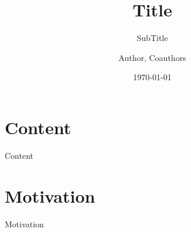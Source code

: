 \documentclass[9pt,pdftex]{beamer}
\title{Title}
\subtitle{SubTitle}
\author[FooterAuthor]{Author, Coauthors} %
\date{\today}
\institute{Technische Universität München}
\begin{document}
	\frame{\titlepage}

\section{Content}
\begin{frame}{Content}
\tableofcontents
\end{frame}
	

\section{Motivation}

\begin{frame}{Motivation}


\end{frame}
\end{document}
